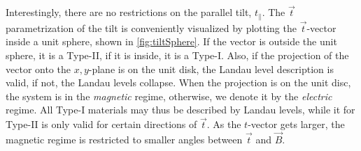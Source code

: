 Interestingly, there are no restrictions on the parallel tilt, \( t_\parallel \).
The \( \vec{t} \) parametrization of the tilt is conveniently visualized by plotting the \( \vec{t} \)-vector inside a unit sphere, shown in \cref{fig:tiltSphere}.
If the vector is outside the unit sphere, it is a Type-II, if it is inside, it is a Type-I.
Also, if the projection of the vector onto the \(x,y\)-plane is on the unit disk, the Landau level description is valid, if not, the Landau levels collapse.
When the projection is on the unit disc, the system is in the \emph{magnetic} regime, otherwise, we denote it by the \emph{electric} regime.
All Type-I materials may thus be described by Landau levels, while it for Type-II is only valid for certain directions of \(\vec{t}\).
As the \(t\)-vector gets larger, the magnetic regime is restricted to smaller angles between \( \vec{t} \) and \( \vec{B} \).
